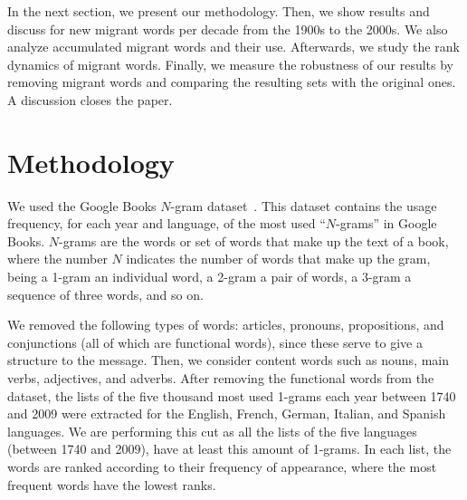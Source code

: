 \documentclass[10pt,letterpaper]{article} %
\begin{document}
In the next section, we present our methodology. Then, we show results and discuss for new migrant words per decade from the 1900s to the 2000s. We also analyze accumulated migrant words and their use. Afterwards, we study the rank dynamics of migrant words. Finally, we measure the robustness of our results by removing migrant words and comparing the resulting sets with the original ones. A discussion closes the paper.



\section*{Methodology} %

We used the Google Books $N$-gram dataset~\cite{ngramv}.
This dataset contains the usage frequency, for each year and language, of
the most used ``$N$-grams'' in Google Books. 
$N$-grams are the words or set of words that make up the text of a
book, where the number $N$ indicates the number of words that make up the gram,
being a 1-gram an individual word, a 2-gram a pair of words,
a 3-gram a sequence of three words, and so on.

	


We removed the following types of words: articles,
pronouns, propositions, and conjunctions (all  of which are functional words),
since these serve to give a structure to the message. Then, we consider content
words such as nouns, main verbs, adjectives, and adverbs. 
After removing the functional words from the dataset, the lists of the five thousand
most used 1-grams each year
between 1740 and 2009 were extracted for the English, French, German, Italian,
and Spanish languages.
We are performing this cut as all the lists of the five languages (between 1740
and 2009), have at least this amount of 1-grams.
In each list, the words are ranked according to their
frequency of appearance, where the most frequent words have the lowest ranks.
\end{document}
